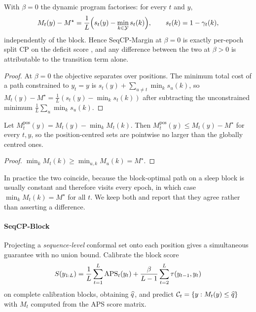 \begin{proposition}[Reduction at $\beta=0$]
\label{prop:reduction}
With $\beta=0$ the dynamic program factorises: for every $t$ and $y$,
\begin{equation}
M_t(y)-M^\star=\frac{1}{L}\Big(s_t(y)-\min_{k\in\mathcal{Y}}s_t(k)\Big),
\qquad s_t(k)=1-\gamma_t(k),
\label{eq:reduction}
\end{equation}
independently of the block. Hence SeqCP-Margin at $\beta=0$ is exactly
per-epoch split CP on the deficit score , and any difference
between the two at $\beta>0$ is attributable to the transition term alone.
\end{proposition}

\begin{proof}
At $\beta=0$ the objective separates over positions. The minimum total cost of
a path constrained to $y_t=y$ is $s_t(y)+\sum_{u\ne t}\min_k s_u(k)$, so
$M_t(y)-M^\star=\frac1L(s_t(y)-\min_k s_t(k))$ after subtracting the
unconstrained minimum $\frac1L\sum_u\min_k s_u(k)$.
\end{proof}

\begin{proposition}
\label{prop:monotone}
Let $M_t^{\mathrm{pos}}(y)=M_t(y)-\min_k M_t(k)$. Then
$M_t^{\mathrm{pos}}(y)\le M_t(y)-M^\star$ for every $t,y$, so the
position-centred sets are pointwise no larger than the globally centred ones.
\end{proposition}

\begin{proof}
$\min_k M_t(k)\ge\min_{u,k}M_u(k)=M^\star$.
\end{proof}

In practice the two coincide, because the block-optimal path on a sleep block
is usually constant and therefore visits every epoch, in which case
$\min_k M_t(k)=M^\star$ for all $t$. We keep both and report that they agree
rather than asserting a difference.

\paragraph{SeqCP-Block}
Projecting a \emph{sequence-level} conformal set onto each position gives a
simultaneous guarantee with no union bound. Calibrate the block score
\begin{equation}
S(y_{1:L})=\frac1L\sum_{t=1}^{L}\mathrm{APS}_t(y_t)
+\frac{\beta}{L-1}\sum_{t=2}^{L}\tau(y_{t-1},y_t)
\label{eq:block-score}
\end{equation}
on complete calibration blocks, obtaining $\widehat{q}$, and predict
$\mathcal{C}_t=\{y:M_t(y)\le\widehat{q}\}$ with $M_t$ computed from the APS score matrix.

